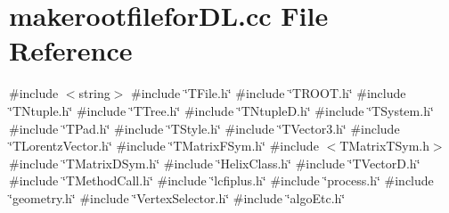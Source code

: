 \section{makerootfilefor\+D\+L.\+cc File Reference}
\label{makerootfileforDL_8cc}
{\ttfamily \#include $<$string$>$}\newline
{\ttfamily \#include \char`\"{}T\+File.\+h\char`\"{}}\newline
{\ttfamily \#include \char`\"{}T\+R\+O\+O\+T.\+h\char`\"{}}\newline
{\ttfamily \#include \char`\"{}T\+Ntuple.\+h\char`\"{}}\newline
{\ttfamily \#include \char`\"{}T\+Tree.\+h\char`\"{}}\newline
{\ttfamily \#include \char`\"{}T\+Ntuple\+D.\+h\char`\"{}}\newline
{\ttfamily \#include \char`\"{}T\+System.\+h\char`\"{}}\newline
{\ttfamily \#include \char`\"{}T\+Pad.\+h\char`\"{}}\newline
{\ttfamily \#include \char`\"{}T\+Style.\+h\char`\"{}}\newline
{\ttfamily \#include \char`\"{}T\+Vector3.\+h\char`\"{}}\newline
{\ttfamily \#include \char`\"{}T\+Lorentz\+Vector.\+h\char`\"{}}\newline
{\ttfamily \#include \char`\"{}T\+Matrix\+F\+Sym.\+h\char`\"{}}\newline
{\ttfamily \#include $<$T\+Matrix\+T\+Sym.\+h$>$}\newline
{\ttfamily \#include \char`\"{}T\+Matrix\+D\+Sym.\+h\char`\"{}}\newline
{\ttfamily \#include \char`\"{}Helix\+Class.\+h\char`\"{}}\newline
{\ttfamily \#include \char`\"{}T\+Vector\+D.\+h\char`\"{}}\newline
{\ttfamily \#include \char`\"{}T\+Method\+Call.\+h\char`\"{}}\newline
{\ttfamily \#include \char`\"{}lcfiplus.\+h\char`\"{}}\newline
{\ttfamily \#include \char`\"{}process.\+h\char`\"{}}\newline
{\ttfamily \#include \char`\"{}geometry.\+h\char`\"{}}\newline
{\ttfamily \#include \char`\"{}Vertex\+Selector.\+h\char`\"{}}\newline
{\ttfamily \#include \char`\"{}algo\+Etc.\+h\char`\"{}}\newline
